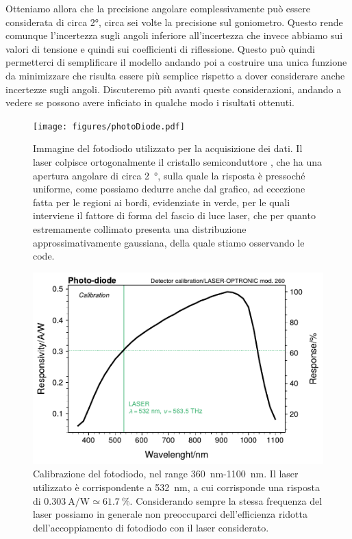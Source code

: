 \documentclass[
    prb,altaffilletter,citeautoscript,
    amsmath,amssymb,
    showpacs,showkeys,floatfix,
    reprint
]{revtex4-1}
\begin{document}
Otteniamo allora che la precisione angolare complessivamente può essere considerata di circa \ang{2}, circa sei volte la precisione sul goniometro. Questo rende comunque l'incertezza sugli angoli inferiore all'incertezza che invece abbiamo sui valori di tensione e quindi sui coefficienti di riflessione. Questo può quindi permetterci di semplificare il modello andando poi a costruire una unica funzione da minimizzare che risulta essere più semplice rispetto a dover considerare anche incertezze sugli angoli. Discuteremo più avanti queste considerazioni, andando a vedere se possono avere inficiato in qualche modo i risultati ottenuti. 

\begin{figure}
    \centering
    \texttt{[image: figures/photoDiode.pdf]}
    \caption{Immagine del fotodiodo utilizzato per la acquisizione dei dati. Il laser colpisce ortogonalmente il cristallo semiconduttore , che ha una apertura angolare di circa \SI{2}{\degree}, sulla quale la risposta è pressoché uniforme, come possiamo dedurre anche dal grafico, ad eccezione fatta per le regioni ai bordi, evidenziate in verde, per le quali interviene il fattore di forma del fascio di luce laser, che per quanto estremamente collimato presenta una distribuzione approssimativamente gaussiana, della quale stiamo osservando le code.}
    \label{fig:photo-diode}
\end{figure}

\begin{figure}
    \centering
    \includegraphics[width=\linewidth]{figures/detector_calib.pdf}
    \caption{Calibrazione del fotodiodo, nel range \SI{360}{\nano\metre}-\SI{1100}{\nano\metre}. Il laser utilizzato è corrispondente a \SI{532}{\nano\metre}, a cui corrisponde una risposta di $\SI{0.303}{\ampere\per\watt}\simeq\SI{61.7}{\%}$. Considerando sempre la stessa frequenza del laser possiamo in generale non preoccuparci dell'efficienza ridotta dell'accoppiamento di fotodiodo con il laser considerato.}
    \label{fig:detector_calib}
\end{figure}
\end{document}
